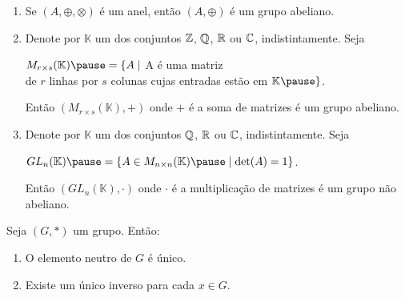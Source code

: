 \documentclass{beamer}
\begin{document}
    \begin{frame}
        \begin{exemplos}
            \begin{enumerate}[label={\arabic*})]
                \item Se $(A,\oplus, \otimes)$ é um anel, então $(A, \oplus)$ é um grupo abeliano.\pause

                \vspace{.3cm}

                \item Denote por $\mathbb{K}$ \pause um dos conjuntos $\mathbb{Z}$, \pause $\mathbb{Q}$, \pause $\mathbb{R}$ \pause ou $\mathbb{C}$, \pause indistintamente. Seja \pause
                \begin{center}
                    $M_{r \times s}(\mathbb{K}) \pause = \{A \mid $ A é uma matriz \pause \\de $r$ linhas \pause por $s$ \pause colunas cujas entradas estão em $\mathbb{K} \pause\}$.
                \end{center}
                Então $(M_{r \times s}(\mathbb{K}), +)$ \pause onde $+$ é a soma de matrizes \pause é um grupo abeliano. \pause

                \vspace{.3cm}

                \item Denote por $\mathbb{K}$ \pause um dos conjuntos $\mathbb{Q}$, \pause $\mathbb{R}$ \pause ou $\mathbb{C}$, \pause indistintamente. Seja \pause
                \begin{center}
                    $GL_n(\mathbb{K}) \pause = \{A \in M_{n \times n}(\mathbb{K}) \pause \mid \det(A) = 1\}$. \pause
                \end{center}
                Então $(GL_n(\mathbb{K}), \cdot)$ \pause onde $\cdot$ é a multiplicação de matrizes é um grupo \pause não abeliano. \pause
            \end{enumerate}
        \end{exemplos}
    \end{frame}

    \begin{frame}
        \begin{proposicao}
            Seja $(G,*)$ um grupo. \pause Então:\pause
            \begin{enumerate}[label={\roman*})]
                \item O elemento neutro de $G$ é único.\pause

                \vspace{.3cm}

                \item Existe um único inverso para cada $x \in G$.

                \seti
            \end{enumerate}
        \end{proposicao}
    \end{frame}
\end{document}
